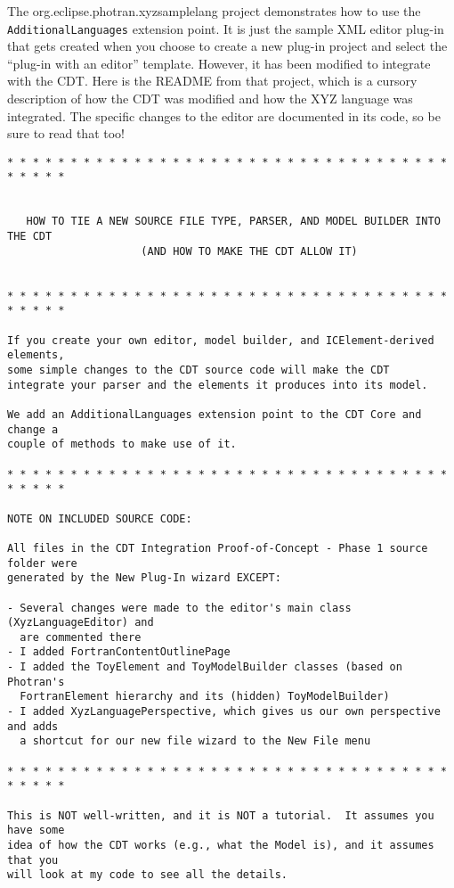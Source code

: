 
The org.eclipse.photran.xyzsamplelang project demonstrates
how to use the \texttt{AdditionalLanguages} extension point.
It is just the sample XML editor plug-in that gets created when you choose
to create a new plug-in project and select the ``plug-in with an editor''
template.  However, it has been modified to integrate with the CDT.
Here is the README from that project, which is a cursory description of
how the CDT was modified and how the XYZ language was integrated.  The
specific changes to the editor are documented in its code, so be sure
to read that too!

\begin{verbatim}
* * * * * * * * * * * * * * * * * * * * * * * * * * * * * * * * * * * * * * * *


   HOW TO TIE A NEW SOURCE FILE TYPE, PARSER, AND MODEL BUILDER INTO THE CDT
                     (AND HOW TO MAKE THE CDT ALLOW IT)


* * * * * * * * * * * * * * * * * * * * * * * * * * * * * * * * * * * * * * * *

If you create your own editor, model builder, and ICElement-derived elements,
some simple changes to the CDT source code will make the CDT
integrate your parser and the elements it produces into its model.

We add an AdditionalLanguages extension point to the CDT Core and change a
couple of methods to make use of it.

* * * * * * * * * * * * * * * * * * * * * * * * * * * * * * * * * * * * * * * *

NOTE ON INCLUDED SOURCE CODE:

All files in the CDT Integration Proof-of-Concept - Phase 1 source folder were
generated by the New Plug-In wizard EXCEPT:

- Several changes were made to the editor's main class (XyzLanguageEditor) and
  are commented there
- I added FortranContentOutlinePage
- I added the ToyElement and ToyModelBuilder classes (based on Photran's
  FortranElement hierarchy and its (hidden) ToyModelBuilder)
- I added XyzLanguagePerspective, which gives us our own perspective and adds
  a shortcut for our new file wizard to the New File menu

* * * * * * * * * * * * * * * * * * * * * * * * * * * * * * * * * * * * * * * *

This is NOT well-written, and it is NOT a tutorial.  It assumes you have some
idea of how the CDT works (e.g., what the Model is), and it assumes that you
will look at my code to see all the details.


\end{verbatim}
